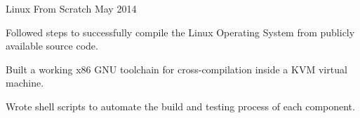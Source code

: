\begin{cventries}
  \cventry
    {Linux From Scratch} %
    {} %
    {} %
    {May 2014} %
    {
      \begin{cvitems} %
        \item {Followed steps to successfully compile the Linux Operating System from publicly available source code.}
        \item {Built a working x86 GNU toolchain for cross-compilation inside a KVM virtual machine.}
        \item {Wrote shell scripts to automate the build and testing process of each component.}
        \\
      \end{cvitems}
    } 

\end{cventries}
